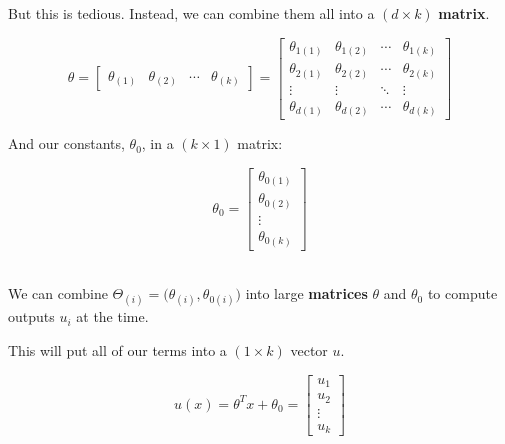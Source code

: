         But this is tedious. Instead, we can combine them all into a $(d \times k)$
        \textbf{matrix}.
        
        \begin{equation}
            \theta = 
            \begin{bmatrix}
                \theta_{(1)} & \theta_{(2)} & \cdots & \theta_{(k)}
            \end{bmatrix}
            =
            \begin{bmatrix}
                \theta_{1(1)} & \theta_{1(2)} & \cdots      & \theta_{1(k)}\\ 
                \theta_{2(1)} & \theta_{2(2)} & \cdots      & \theta_{2(k)}\\ 
                \vdots      & \vdots      & \ddots      & \vdots     \\ 
                \theta_{d(1)} & \theta_{d(2)} & \cdots      & \theta_{d(k)}
            \end{bmatrix}
        \end{equation}
        
        And our constants, $\theta_0$, in a $(k \times 1)$ matrix:
        
        \begin{equation}
            \theta_0 =
            \begin{bmatrix}
                \theta_{0(1)} \\ \theta_{0(2)} \\ \vdots \\ \theta_{0(k)}
            \end{bmatrix}
        \end{equation}\\
        
        \begin{concept}
            We can combine  $\Theta_{(i)}=\Big(\theta_{(i)}, \theta_{0(i)} \Big)$ into large \textbf{matrices} $\theta$ and $\theta_0$ to compute  outputs $u_i$ at the  time.
        \end{concept}
        
        This will put all of our terms into a $(1 \times k)$ vector $u$.
        
        \begin{equation}
            u(x) = 
            \theta^T x + \theta_0
            =
            \begin{bmatrix}
                u_1 \\ u_2 \\ \vdots \\ u_k
            \end{bmatrix}
        \end{equation}
    
